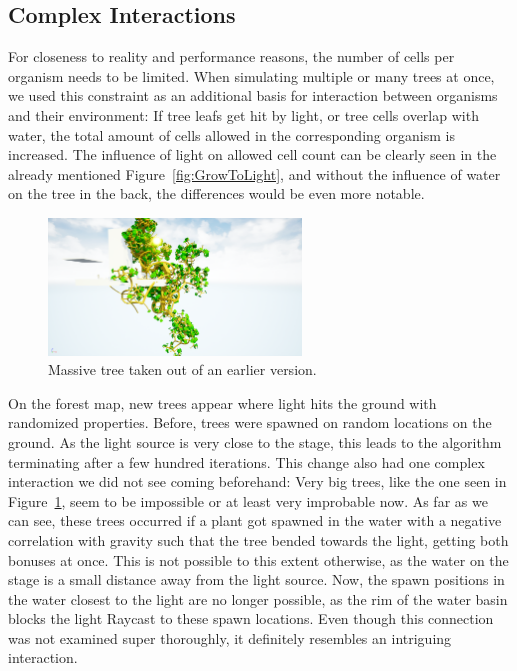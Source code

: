 \documentclass[11pt, abstract=on]{scrartcl}
\begin{document}
\subsection{Complex Interactions}

For closeness to reality and performance reasons, the number of cells per organism needs to be limited. When simulating multiple or many trees at once, we used this constraint as an additional basis for interaction between organisms and their environment: If tree leafs get hit by light, or tree cells overlap with water, the total amount of cells allowed in the corresponding organism is increased. The influence of light on allowed cell count can be clearly seen in the already mentioned Figure~\ref{fig:GrowToLight}, and without the influence of water on the tree in the back, the differences would be even more notable.

\begin{figure}
 	 \centering
 	    \includegraphics[width=0.6\textwidth]{SS_BIGTree.png}
 	 \caption{Massive tree taken out of an earlier version.}
 	 \label{fig:BIGTree}
\end{figure}

On the forest map, new trees appear where light hits the ground with randomized properties. Before, trees were spawned on random locations on the ground. As the light source is very close to the stage, this leads to the algorithm terminating after a few hundred iterations. This change also had one complex interaction we did not see coming beforehand: Very big trees, like the one seen in Figure~\ref{fig:BIGTree}, seem to be impossible or at least very improbable now. As far as we can see, these trees occurred if a plant got spawned in the water with a negative correlation with gravity such that the tree bended towards the light, getting both bonuses at once. This is not possible to this extent otherwise, as the water on the stage is a small distance away from the light source. Now, the spawn positions in the water closest to the light are no longer possible, as the rim of the water basin blocks the light Raycast to these spawn locations. Even though this connection was not examined super thoroughly, it definitely resembles an intriguing interaction.
\end{document}
